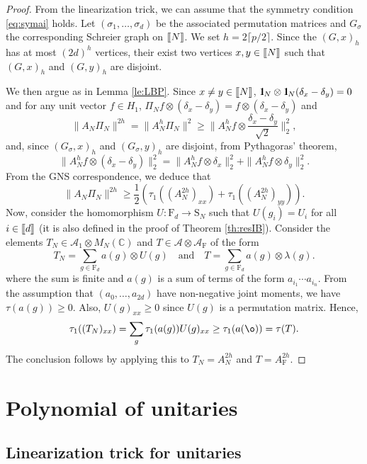 \documentclass[11pt]{article}
\renewcommand{\star}{{\mathrm{F}}}
\newcommand{\cA}{\mathcal{A}}
\newcommand{\dF}{\mathrm{F}}
\newcommand{\dS}{\mathrm{S}}
\newcommand{\dC}{\mathbb {C}}
\newcommand{\PAR}[1]{{{\left(#1\right)}}} %
\newcommand{\AND}{\quad \mathrm{and} \quad}
\newcommand{\1}{1\!\!{\sf I}}
\newcommand{\IND}{\1}
\newcommand{\INT}[1]{{{\left[\hspace{-1.4pt}\left[#1\right]\hspace{-1.4pt}\right]}}}
\begin{document}
\begin{proof} From the linearization trick, we can assume that the symmetry condition \eqref{eq:symai} holds. Let $(\sigma_1,\ldots,\sigma_{d})$ be the associated permutation matrices and $G_\sigma$ the corresponding Schreier graph on $\INT{N}$. We set $h = 2 \lceil p/2 \rceil $. Since the $(G,x)_h$ has at most $(2d)^h$ vertices, their exist two vertices $x,y \in \INT{N}$ such that  $(G,x)_h$ and $(G,y)_h$ are disjoint. 

We then argue as in Lemma \ref{le:LBP}. Since $x \ne y \in \INT{N}$,  $\IND_N \otimes \IND_N (\delta_x - \delta_{y}) = 0$ and for any unit vector $f \in H_1$, $\Pi_N f \otimes  (\delta_x - \delta_{y}) = f \otimes  (\delta_x - \delta_{y})$ and
$$
\| A_N \Pi_N   \|^{2h} = \| A^{h} _N \Pi_N    \|^2 \geq \| A_N ^{h} f \otimes \frac{ \delta_x - \delta_{y}}{\sqrt 2} \|^2_2,
$$
and, since $(G_\sigma,x)_h$ and  $(G_\sigma,y)_h$ are disjoint, from Pythagoras' theorem,
$$
\| A_N^{h} f \otimes ( \delta_x - \delta_{y})\|^2_2 =  \| A_N^{h} f \otimes \delta_x\|^2_2 + \| A_N^{h} f \otimes \delta_{y}\|^2_2.
$$ 
From the GNS correspondence, we deduce that 
$$
\| A_N \Pi_N \|^{2h} \geq \frac{1}{2} \PAR{\tau_1 ( (A_N^{2h} )_{x x} )   + \tau_1 ( (A_N^{2h})_{y y}) }.  
$$ 
Now,  consider the homomorphism $U: \dF_d \to \dS_N$ such that $U(g_i) = U_i$ for all $i \in \INT{d}$ (it is also defined in the proof of Theorem  \ref{th:resIB}). Consider the elements $T_N \in \cA_1 \otimes M_N(\dC)$ and $T \in \cA \otimes \cA_\star$ of the form 
$$
T_N = \sum_{g \in \dF_d} a(g) \otimes U(g) \AND T = \sum_{g \in \dF_d} a(g) \otimes \lambda(g).
$$
where the sum is finite and $a(g)$ is a sum of terms of the form $a_{i_1}\cdots a_{i_n}$.  From the assumption that $(a_0,\ldots, a_{2d})$ have non-negative joint moments, we have $\tau(a(g)) \geq 0$. Also, $U(g)_{xx} \geq 0$ since $U(g)$ is a permutation matrix. Hence, 
$$
\tau_1(  (T_N)_{xx} ) = \sum_g \tau_1(a(g)) U(g)_{xx} \geq  \tau_1 (a(\o)) =\tau (T).  
$$
The conclusion follows by applying this to $T_N = A_N^{2h}$ and $T =A_\star^{2h}$.
\end{proof}

\section{Polynomial of unitaries}
\label{sec:poly}

\subsection{Linearization trick for unitaries}
\end{document}
